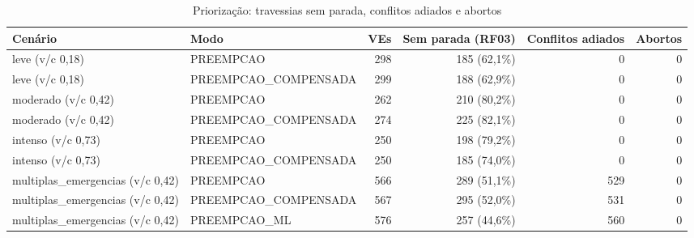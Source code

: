 \begin{table}[htbp]
\centering
\caption{Priorização: travessias sem parada, conflitos adiados e abortos}
\label{tab:t4}
\small
\begin{tabular}{llrrrr}
\toprule
Cenário & Modo & VEs & Sem parada (RF03) & Conflitos adiados & Abortos \\
\midrule
leve (v/c 0,18) & PREEMPCAO & 298 & 185 (62,1\%) & 0 & 0 \\
leve (v/c 0,18) & PREEMPCAO\_COMPENSADA & 299 & 188 (62,9\%) & 0 & 0 \\
moderado (v/c 0,42) & PREEMPCAO & 262 & 210 (80,2\%) & 0 & 0 \\
moderado (v/c 0,42) & PREEMPCAO\_COMPENSADA & 274 & 225 (82,1\%) & 0 & 0 \\
intenso (v/c 0,73) & PREEMPCAO & 250 & 198 (79,2\%) & 0 & 0 \\
intenso (v/c 0,73) & PREEMPCAO\_COMPENSADA & 250 & 185 (74,0\%) & 0 & 0 \\
multiplas\_emergencias (v/c 0,42) & PREEMPCAO & 566 & 289 (51,1\%) & 529 & 0 \\
multiplas\_emergencias (v/c 0,42) & PREEMPCAO\_COMPENSADA & 567 & 295 (52,0\%) & 531 & 0 \\
multiplas\_emergencias (v/c 0,42) & PREEMPCAO\_ML & 576 & 257 (44,6\%) & 560 & 0 \\
\bottomrule
\end{tabular}
\end{table}

